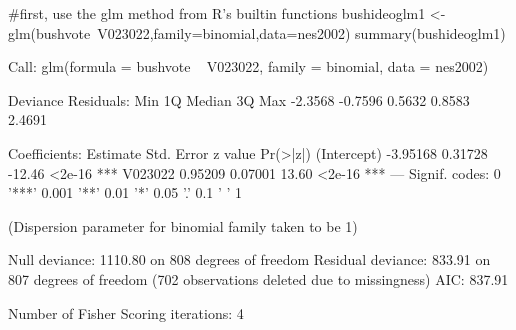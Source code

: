 \begin{Schunk}
\begin{Sinput}
 #first, use the glm method from R's builtin functions
 bushideoglm1 <- glm(bushvote~V023022,family=binomial,data=nes2002) 
 summary(bushideoglm1)
\end{Sinput}
\begin{Soutput}
Call:
glm(formula = bushvote ~ V023022, family = binomial, data = nes2002)

Deviance Residuals: 
    Min       1Q   Median       3Q      Max  
-2.3568  -0.7596   0.5632   0.8583   2.4691  

Coefficients:
            Estimate Std. Error z value Pr(>|z|)    
(Intercept) -3.95168    0.31728  -12.46   <2e-16 ***
V023022      0.95209    0.07001   13.60   <2e-16 ***
---
Signif. codes:  0 '***' 0.001 '**' 0.01 '*' 0.05 '.' 0.1 ' ' 1

(Dispersion parameter for binomial family taken to be 1)

    Null deviance: 1110.80  on 808  degrees of freedom
Residual deviance:  833.91  on 807  degrees of freedom
  (702 observations deleted due to missingness)
AIC: 837.91

Number of Fisher Scoring iterations: 4
\end{Soutput}
\end{Schunk}
